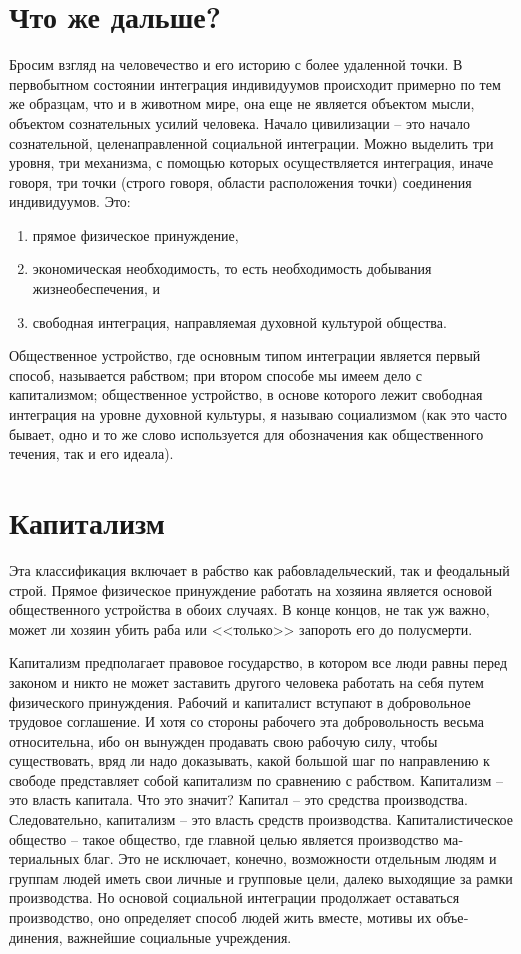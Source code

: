 \documentclass{book}
\begin{document}
\section{Что же дальше?}

Бросим взгляд на человечество и его историю с более уда­ленной точки. В первобытном состоянии интеграция индивиду­умов происходит примерно по тем же образцам, что и в живот­ном мире, она еще не является объектом мысли, объектом со­знательных усилий человека. Начало цивилизации -- это начало сознательной, целенаправленной социальной интеграции. Можно выделить три уровня, три механизма, с помощью которых осуществляется интеграция, иначе говоря, три точки (строго говоря, области расположения точки) соединения индивидуумов. Это:
\begin{enumerate}
 \item прямое физическое принуждение,
 \item экономическая необходимость, то есть необходимость добывания жизнеобеспечения, и
 \item свободная интеграция, направляемая духовной культурой общества. 
\end{enumerate}

Общественное устройство, где основным типом интеграции является первый способ, называется рабством;  при втором способе мы имеем дело с капитализмом;  общественное устройство, в основе которого лежит свободная интеграция на уровне духовной культуры, я называю социализмом  (как это часто бывает, одно и то же слово используется для обозначения как общественного течения, так и его идеала).



\section{Капитализм}

Эта классификация включает в рабство как рабовладельческий, так и феодальный строй. Прямое физическое принуждение работать на хозяина является основой общественного устройства в обоих случаях. В конце концов, не так уж важно, может ли хозяин убить раба или <<только>> запороть его до полусмерти.

Капитализм предполагает правовое государство, в котором все люди равны перед законом и никто не может заставить другого человека работать на себя путем физического принуждения. Рабочий и капиталист вступают в добровольное трудовое соглашение. И хотя со стороны рабочего эта добровольность весьма относительна, ибо он вынужден продавать свою рабо­чую силу, чтобы существовать, вряд ли надо доказывать, какой большой шаг по направлению к свободе представляет собой капитализм по сравнению с рабством.
Капитализм -- это власть капитала. Что это значит? Капитал -- это средства производства. Следовательно, капитализм -- это власть средств производства. Капиталистическое общество -- такое общество, где главной целью является производство ма­териальных благ. Это не исключает, конечно, возможности от­дельным людям и группам людей иметь свои личные и группо­вые цели, далеко выходящие за рамки производства. Но осно­вой социальной интеграции  продолжает оставаться производст­во, оно определяет способ людей жить вместе, мотивы их объе­динения, важнейшие социальные учреждения.
\end{document}
